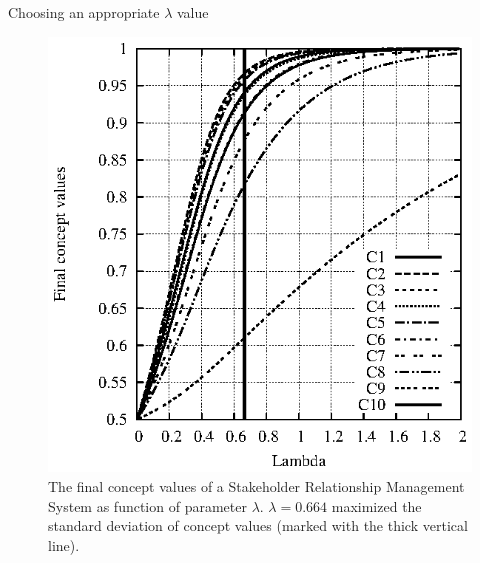 \documentclass[graybox]{svmult}
\begin{document}
\begin{backgroundinformation}{Choosing an appropriate $\lambda$ value}
\begin{figure}[hbt]
  \begin{center}
    \includegraphics[scale=.9]{ascc2015plots/lambda.eps}
  \end{center}
  \caption{The final concept values of a Stakeholder Relationship Management System as function of parameter $\lambda$. $\lambda = 0.664$ maximized the standard deviation of concept values (marked with the thick vertical line).}
  \label{fig:lambdaDependence}
\end{figure}


\end{backgroundinformation}
\end{document}
